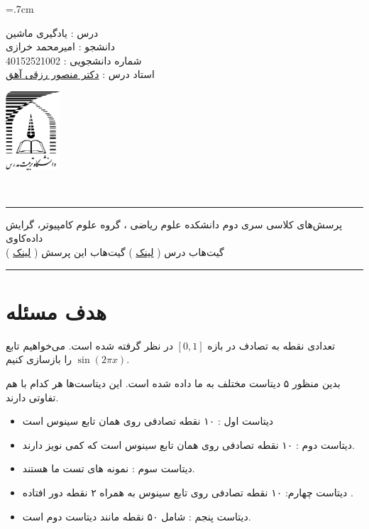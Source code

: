 \documentclass[a4paper, 12pt]{article}
\begin{document}
	
\noindent
\begin{minipage}[c]{5cm}
	\baselineskip=.7cm
	\begin{flushright}
		درس : یادگیری ماشین 
		\\
		دانشجو :
		امیرمحمد خرازی
		\\
		شماره دانشجویی :
		40152521002 
		\\
		استاد درس :  
		\href{mrezghi.ir}{دکتر منصور رزقی آهق}
	\end{flushright}
\end{minipage}
\hfill
\begin{minipage}[c]{3cm}
	\begin{center}
		\href{modares.ac.ir}{
			\includegraphics[width=2cm]{logo.png}}
	\end{center}	
\end{minipage}
\\[1mm]
\hrule depth .5mm \relax
\begin{flushright}
	پرسش‌های کلاسی سری دوم
	\hfill
	دانشکده علوم ریاضی ، گروه علوم کامپیوتر، گرایش داده‌کاوی
	\\
	\vspace{5mm}
	گیت‌هاب درس (
	\href{https://github.com/A-M-Kharazi/Machine-Learning-TMU.git}{لینک}
	)
	\hfill
	گیت‌هاب این پرسش (
	\href{https://github.com/A-M-Kharazi/Machine-Learning-TMU/tree/main/Questions/Q-Series2}{لینک}
	)
\end{flushright}

\hrule depth .5mm\relax



\section*{هدف مسئله}
تعدادی نقطه به تصادف در بازه 
$[0,1]$
در نظر گرفته شده است. می‌خواهیم تابع 
$\sin(2\pi x)$
را بازسازی کنیم.

بدین منظور ۵  دیتاست مختلف به ما داده شده است. این دیتاست‌ها هر کدام با هم تفاوتی دارند. 
\begin{itemize}
	\item
	دیتاست اول : ۱۰ نقطه تصادفی روی همان تابع سینوس است
	\item
	دیتاست دوم : ۱۰ نقطه تصادفی روی همان تابع سینوس است که کمی نویز دارند.
	
	\item
	دیتاست سوم : نمونه های تست ما هستند.
	\item
	دیتاست چهارم: ۱۰ نقطه تصادفی روی تابع سینوس به همراه ۲ نقطه دور افتاده .
	\item
	دیتاست پنجم : شامل ۵۰ نقطه مانند دیتاست دوم است.
\end{itemize}
\end{document}
